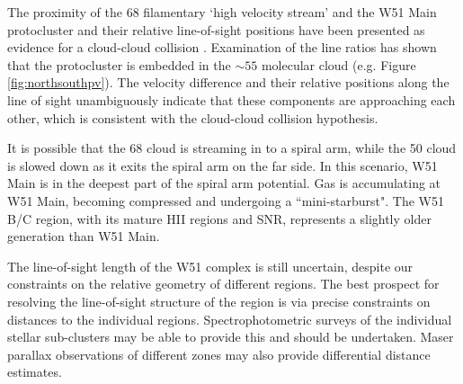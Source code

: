 The proximity of the 68 \kms filamentary `high velocity stream' and the W51
Main protocluster and their relative line-of-sight positions have been
presented as evidence for a cloud-cloud collision \citep{Kang2010a}.
Examination of the \formaldehyde line ratios has shown that the protocluster is
embedded in the $\sim55$ \kms molecular cloud (e.g. Figure
\ref{fig:northsouthpv}).  The velocity difference and their relative positions
along the line of sight unambiguously indicate that these
components are approaching each other, which is consistent with the cloud-cloud
collision hypothesis.

It is possible that the 68 \kms cloud is streaming in to a spiral arm, while
the 50 \kms cloud is slowed down as it exits the spiral arm on the far side.
In this scenario, W51 Main is in the deepest part of the spiral arm potential.
Gas is accumulating at W51 Main,  becoming compressed and undergoing a
``mini-starburst".  The W51 B/C region, with its mature HII
regions and SNR, represents a slightly older generation than W51 Main.




The line-of-sight length of the W51 complex is still uncertain, despite our
constraints on the relative geometry of different regions.  The best prospect
for resolving the line-of-sight structure of the region is via precise
constraints on distances to the individual regions.  Spectrophotometric surveys
of the individual stellar sub-clusters may be able to provide this and should
be undertaken.  Maser parallax observations of different zones may also provide
differential distance estimates.

